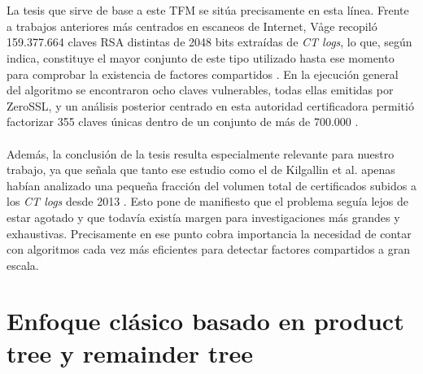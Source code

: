 \\
\\
La tesis que sirve de base a este TFM se sitúa precisamente en esta línea. Frente a trabajos anteriores más centrados en escaneos de Internet, Våge recopiló 159.377.664 claves RSA distintas de 2048 bits extraídas de \textit{CT logs}, lo que, según indica, constituye el mayor conjunto de este tipo utilizado hasta ese momento para comprobar la existencia de factores compartidos \cite{vage2022finding}. En la ejecución general del algoritmo se encontraron ocho claves vulnerables, todas ellas emitidas por ZeroSSL, y un análisis posterior centrado en esta autoridad certificadora permitió factorizar 355 claves únicas dentro de un conjunto de más de 700.000 \cite{vage2022finding}.
\\
\\
Además, la conclusión de la tesis resulta especialmente relevante para nuestro trabajo, ya que señala que tanto ese estudio como el de Kilgallin et al. apenas habían analizado una pequeña fracción del volumen total de certificados subidos a los \textit{CT logs} desde 2013 \cite{vage2022finding}. Esto pone de manifiesto que el problema seguía lejos de estar agotado y que todavía existía margen para investigaciones más grandes y exhaustivas. Precisamente en ese punto cobra importancia la necesidad de contar con algoritmos cada vez más eficientes para detectar factores compartidos a gran escala.

\section{Enfoque clásico basado en product tree y remainder tree}

